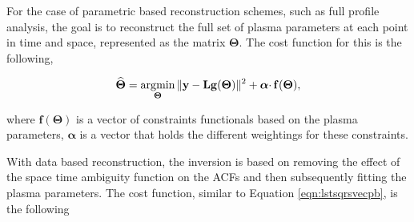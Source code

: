 %
%
%
%
%


For the case of parametric based reconstruction schemes, such as full profile analysis, the goal is to reconstruct the full set of plasma parameters at each point in time and space, represented as the matrix $\boldsymbol{\Theta}$. The cost function for this is the following, 

\begin{equation}
\label{eqn:lstsqrsvecpb}
\widehat{\boldsymbol{\Theta}} = \operatorname*{\arg\!\min}\limits_{\boldsymbol{\Theta}} \|\mathbf{y} -\mathbf{L}\mathbf{ g}(\boldsymbol{\Theta}) \|^2 + \boldsymbol{\alpha}\cdotp\mathbf{f}(\boldsymbol{\Theta}),
\end{equation}

\noindent where $\mathbf{f}(\boldsymbol{\Theta})$ is a vector of constraints functionals based on the plasma parameters, $\boldsymbol{\alpha}$ is a vector that holds the different weightings for these constraints.

With data based reconstruction, the inversion is based on removing the effect of the space time ambiguity function on the ACFs and then subsequently fitting the plasma parameters. The cost function, similar to Equation \ref{eqn:lstsqrsvecpb}, is the following

